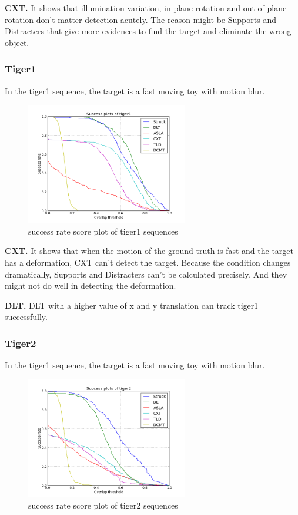 \documentclass{acm_proc_article-sp}
\begin{document}
\textbf{CXT.} It shows that illumination variation, in-plane rotation and out-of-plane rotation don't matter detection acutely. The reason might be Supports and Distracters that give more evidences to find the target and eliminate the wrong object.

\subsubsection{Tiger1}

In the tiger1 sequence, the target is a fast moving toy with motion blur.

\begin{figure}[hbt]
    \includegraphics[width=200pt]{tiger1}
    \caption{success rate score plot of tiger1 sequences}
    \label{fig:tiger1}
\end{figure}

\textbf{CXT.} It shows that when the motion of the ground truth is fast and the target has a deformation, CXT can't detect the target. Because the condition changes dramatically, Supports and Distracters can't be calculated precisely. And they might not do well in detecting the deformation.

\textbf{DLT.} DLT with a higher value of x and y translation can track tiger1 successfully.

\subsubsection{Tiger2}

In the tiger1 sequence, the target is a fast moving toy with motion blur.

\begin{figure}[hbt]
    \includegraphics[width=200pt]{tiger2}
    \caption{success rate score plot of tiger2 sequences}
    \label{fig:tiger2}
\end{figure}
\end{document}
